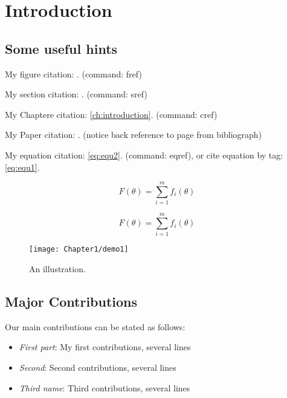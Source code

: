 
\chapter{Introduction} %
\label{ch:introduction} %


\section{Some useful hints}

My figure citation: . (command: fref)

My section citation: . (command: sref)

My Chaptere citation: \cref{ch:introduction}. (command: cref)

My Paper citation: \cite{bauschke2011convex}. (notice back reference to page from bibliograph)

My equation citation: \eqref{eq:equ2}. (command: eqref), or cite equation by tag: \eqref{eq:equ1}.

\begin{equation}\label{eq:equ1}
F(\theta)=\sum_{i=1}^mf_i(\theta) \tag{DOP}
\end{equation}

\begin{equation}\label{eq:equ2}
F(\theta)=\sum_{i=1}^mf_i(\theta)
\end{equation}

\begin{figure}[htbp]
  \centering
    \texttt{[image: Chapter1/demo1]}
  \caption{An illustration.}
  \label{fig:demo1}
\end{figure}



\section{Major Contributions}\label{sec:contribution}
Our main contributions can be stated as follows:
\begin{itemize}
\item \emph{First part}: My first contributions, several lines


\item \emph{Second}: Second contributions, several lines


\item \emph{Third name}: 
Third contributions, several lines

\end{itemize}

